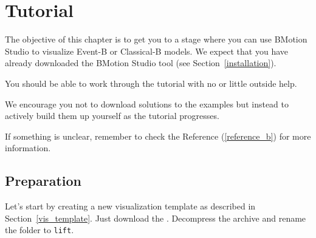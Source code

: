 \section{Tutorial}
\label{tutorial_b}

The objective of this chapter is to get you to a stage where you can use BMotion Studio to visualize Event-B or Classical-B models. 
We expect that you have already downloaded the BMotion Studio tool (see Section~\ref{installation}).
 
You should be able to work through the tutorial with no or little outside help.

We encourage you not to download solutions to the examples but instead to actively build them up yourself as the tutorial progresses.

If something is unclear, remember to check the Reference (\ref{reference_b}) for more information.

\subsection{Preparation}

Let's start by creating a new visualization template as described in Section~\ref{vis_template}.
Just download the .
Decompress the archive and rename the folder to \texttt{lift}.

